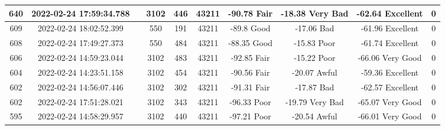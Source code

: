 \begin{longtable*}{|c|c|c|c|c|c|c|c|c|c|}
640&2022-02-24 17:59:34.788&&3102&446&43211& -90.78    Fair        & -18.38    Very Bad    & -62.64    Excellent   & 0\\\hline
{}609&2022-02-24 18:02:52.399&&550&191&43211& -89.8     Good        & -17.06    Bad         & -61.96    Excellent   & 0\\\hline
{}608&2022-02-24 17:49:27.373&&550&484&43211& -88.35    Good        & -15.83    Poor        & -61.74    Excellent   & 0\\\hline
{}606&2022-02-24 14:59:23.044&&3102&483&43211& -92.85    Fair        & -15.22    Poor        & -66.06    Very Good   & 0\\\hline
{}604&2022-02-24 14:23:51.158&&3102&454&43211& -90.56    Fair        & -20.07    Awful       & -59.36    Excellent   & 0\\\hline
{}602&2022-02-24 14:56:07.446&&3102&302&43211& -91.31    Fair        & -17.87    Bad         & -62.57    Excellent   & 0\\\hline
{}602&2022-02-24 17:51:28.021&&3102&343&43211& -96.33    Poor        & -19.79    Very Bad    & -65.07    Very Good   & 0\\\hline
{}595&2022-02-24 14:58:29.957&&3102&440&43211& -97.21    Poor        & -20.54    Awful       & -66.01    Very Good   & 0\\\hline

\end{longtable*}
